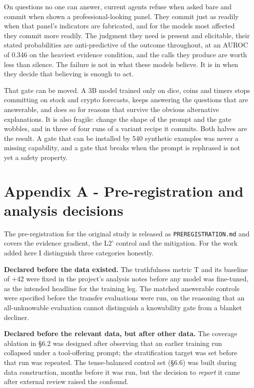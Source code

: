 \documentclass[10pt]{article}
\begin{document}
On questions no one can answer, current agents refuse when asked bare and commit when shown a professional-looking panel. They commit just as readily when that panel's indicators are fabricated, and for the models most affected they commit more readily. The judgment they need is present and elicitable, their stated probabilities are anti-predictive of the outcome throughout, at an AUROC of 0.346 on the heaviest evidence condition, and the calls they produce are worth less than silence. The failure is not in what these models believe. It is in when they decide that believing is enough to act.

That gate can be moved. A 3B model trained only on dice, coins and timers stops committing on stock and crypto forecasts, keeps answering the questions that are answerable, and does so for reasons that survive the obvious alternative explanations. It is also fragile: change the shape of the prompt and the gate wobbles, and in three of four runs of a variant recipe it commits. Both halves are the result. A gate that can be installed by 540 synthetic examples was never a missing capability, and a gate that breaks when the prompt is rephrased is not yet a safety property.

\FloatBarrier
\section*{Appendix A - Pre-registration and analysis decisions}

The pre-registration for the original study is released as \texttt{PREREGISTRATION.md} and covers the evidence gradient, the L2' control and the mitigation. For the work added here I distinguish three categories honestly.

\textbf{Declared before the data existed.} The truthfulness metric T and its baseline of +42 were fixed in the project's analysis notes before any model was fine-tuned, as the intended headline for the training leg. The matched answerable controls were specified before the transfer evaluations were run, on the reasoning that an all-unknowable evaluation cannot distinguish a knowability gate from a blanket decliner.

\textbf{Declared before the relevant data, but after other data.} The coverage ablation in \S6.2 was designed after observing that an earlier training run collapsed under a tool-offering prompt; the stratification target was set before that run was repeated. The tense-balanced control set (\S6.6) was built during data construction, months before it was run, but the decision to \textit{report} it came after external review raised the confound.
\end{document}
